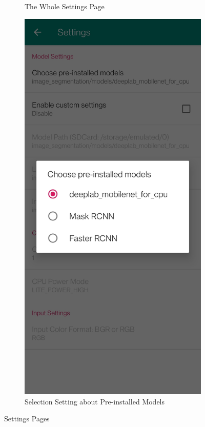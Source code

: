 \begin{figure}[htbp]
\begin{subfigure}[t]{0.4\linewidth}
        \caption{The Whole Settings Page}\label{settings}
    \end{subfigure}
    \begin{subfigure}[t]{0.4\linewidth}
        \includegraphics[width=1\textwidth]{figures/type.jpg}
        \caption{Selection Setting about Pre-installed Models}\label{type}
    \end{subfigure}
    \caption{Settings Pages}\label{result1}
\end{figure}

